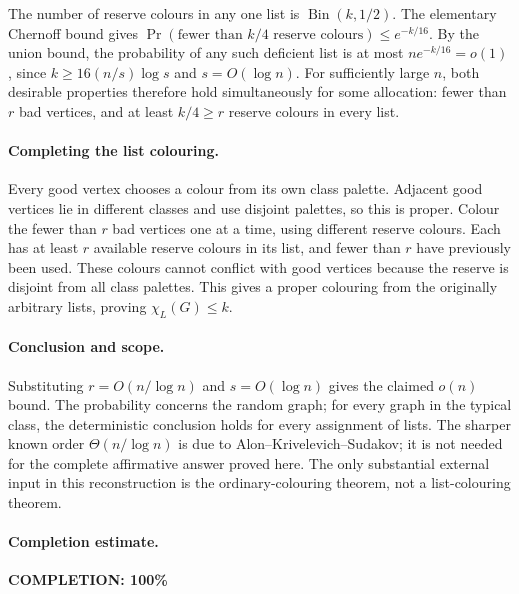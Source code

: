 The number of reserve colours in any one list is
\(\operatorname{Bin}(k,1/2)\).
The elementary Chernoff bound gives
\(\Pr(\text{fewer than }k/4\text{ reserve colours})\leq e^{-k/16}\).
By the union bound, the probability of any such deficient
list is at most \(ne^{-k/16}=o(1)\), since
\(k\geq16(n/s)\log s\) and \(s=O(\log n)\).
For sufficiently large \(n\), both desirable properties
therefore hold simultaneously for some allocation:
fewer than \(r\) bad vertices, and at least \(k/4\geq r\)
reserve colours in every list.

\paragraph{Completing the list colouring.}
Every good vertex chooses a colour from its own class palette.
Adjacent good vertices lie in different classes and use
disjoint palettes, so this is proper.
Colour the fewer than \(r\) bad vertices one at a time,
using different reserve colours.
Each has at least \(r\) available reserve colours in its list,
and fewer than \(r\) have previously been used.
These colours cannot conflict with good vertices because
the reserve is disjoint from all class palettes.
This gives a proper colouring from the originally arbitrary
lists, proving \(\chi_L(G)\leq k\).

\paragraph{Conclusion and scope.}
Substituting \(r=O(n/\log n)\) and \(s=O(\log n)\) gives
the claimed \(o(n)\) bound.
The probability concerns the random graph; for every
graph in the typical class, the deterministic conclusion
holds for every assignment of lists.
The sharper known order \(\Theta(n/\log n)\) is due to
Alon--Krivelevich--Sudakov; it is not needed for the
complete affirmative answer proved here.
The only substantial external input in this reconstruction
is the ordinary-colouring theorem, not a list-colouring theorem.

\paragraph{Completion estimate.}
\textbf{COMPLETION: 100\%}
